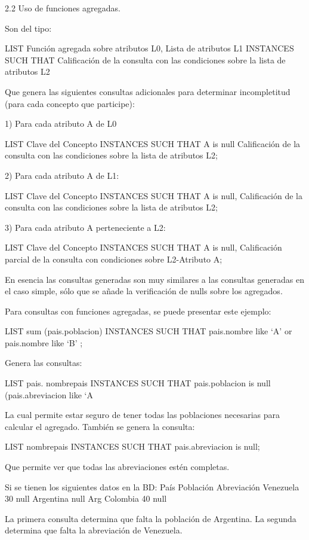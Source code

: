 2.2 Uso de funciones agregadas.

Son del tipo:

LIST Función agregada sobre atributos L0, Lista de atributos L1 INSTANCES
SUCH THAT Calificación de la consulta con las condiciones sobre la lista de atributos L2

	Que genera las siguientes consultas adicionales para determinar incompletitud (para cada concepto que participe):

1) Para cada atributo A de L0

LIST Clave del Concepto INSTANCES
SUCH THAT  A is null Calificación de la consulta con las condiciones sobre la lista de atributos L2;

2) Para cada atributo A de L1:

LIST Clave del Concepto INSTANCES
SUCH THAT A is null, Calificación de la consulta con las condiciones sobre la lista de atributos L2;

3)  Para cada atributo A perteneciente a L2:

LIST Clave del Concepto INSTANCES
SUCH THAT A is null, Calificación parcial de la consulta con condiciones sobre L2-{Atributo A};

	En esencia las consultas generadas son muy similares a las consultas generadas en el caso simple, sólo que se añade la verificación de nulls sobre los agregados.

	Para consultas con funciones agregadas, se puede presentar este ejemplo:

LIST sum (pais.poblacion) INSTANCES
SUCH THAT pais.nombre like ‘A’ or pais.nombre like ‘B’ ;

	Genera las consultas:

LIST pais. nombrepais INSTANCES
SUCH THAT pais.poblacion is null  (pais.abreviacion like ‘A%

La cual permite estar seguro de tener todas las poblaciones necesarias para calcular el agregado. También se genera la consulta:

LIST nombrepais INSTANCES
SUCH THAT pais.abreviacion is null;

Que permite ver que todas las abreviaciones estén completas.

	Si se tienen los siguientes datos en la BD:
País	Población	Abreviación
Venezuela	30	null
Argentina	null	Arg
Colombia	40	null




La primera consulta determina que falta la población de Argentina. La segunda determina que falta la abreviación de Venezuela.
	

